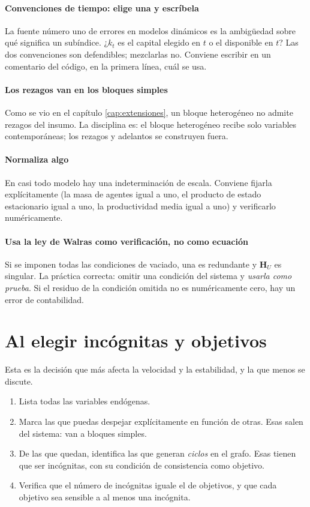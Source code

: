 \paragraph{Convenciones de tiempo: elige una y escríbela} La fuente número uno de
errores en modelos dinámicos es la ambigüedad sobre qué significa un subíndice.
¿$k_t$ es el capital elegido en $t$ o el disponible en $t$? Las dos convenciones
son defendibles; mezclarlas no. Conviene escribir en un comentario del código,
en la primera línea, cuál se usa.

\paragraph{Los rezagos van en los bloques simples} Como se vio en el capítulo
\ref{cap:extensiones}, un bloque heterogéneo no admite rezagos del insumo. La
disciplina es: el bloque heterogéneo recibe solo variables contemporáneas; los
rezagos y adelantos se construyen fuera.

\paragraph{Normaliza algo} En casi todo modelo hay una indeterminación de escala.
Conviene fijarla explícitamente (la masa de agentes igual a uno, el producto de
estado estacionario igual a uno, la productividad media igual a uno) y
verificarlo numéricamente.

\paragraph{Usa la ley de Walras como verificación, no como ecuación} Si se
imponen todas las condiciones de vaciado, una es redundante y $\mathbf{H}_U$ es
singular. La práctica correcta: omitir una condición del sistema y \emph{usarla
como prueba}. Si el residuo de la condición omitida no es numéricamente cero, hay
un error de contabilidad.

\section{Al elegir incógnitas y objetivos}

Esta es la decisión que más afecta la velocidad y la estabilidad, y la que menos
se discute.

\begin{receta}
\begin{enumerate}[leftmargin=1.4em,itemsep=2pt]
\item Lista todas las variables endógenas.
\item Marca las que puedas despejar explícitamente en función de otras. Esas
salen del sistema: van a bloques simples.
\item De las que quedan, identifica las que generan \emph{ciclos} en el grafo.
Esas tienen que ser incógnitas, con su condición de consistencia como objetivo.
\item Verifica que el número de incógnitas iguale el de objetivos, y que cada
objetivo sea sensible a al menos una incógnita.
\end{enumerate}
\end{receta}

